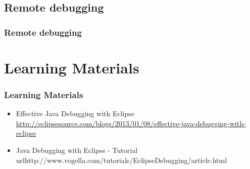 \documentclass{beamer}
\begin{document}
\subsection{Remote debugging}
\begin{frame}[fragile]
\frametitle{Remote debugging}
\end{frame}

\section{Learning Materials}
\begin{frame}[fragile]
\frametitle{Learning Materials}
\begin{itemize}
\item Effective Java Debugging with Eclipse\\\url{http://eclipsesource.com/blogs/2013/01/08/effective-java-debugging-with-eclipse}
\item Java Debugging with Eclipse - Tutorial\\url{http://www.vogella.com/tutorials/EclipseDebugging/article.html}
\end{itemize}
\end{frame}
\end{document}
